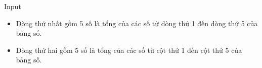 Input
\begin{itemize}
	\item Dòng thứ nhất gồm 5 số là tổng của các số từ dòng thứ 1 đến dòng thứ 5 của bảng số.
	\item Dòng thứ hai gồm 5 số là tổng của các số từ cột thứ 1 đến cột thứ 5 của bảng số.
\end{itemize}